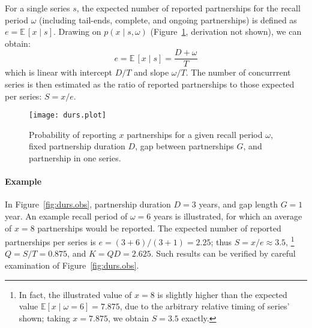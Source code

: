 For a single series $s$, the expected number of reported partnerships for the recall period $\omega$
(including tail-ends, complete, and ongoing partnerships)
is defined as $e = \mathbb{E}\,[x\mid s]$.
Drawing on $p(x \mid s,\omega)$ (Figure~\ref{fig:durs.plot}, derivation not shown), we can obtain:
\begin{equation}\label{eq:e.dur}
  e = \mathbb{E}\,[x\mid s] = \frac{D + \omega}{T}
\end{equation}
which is linear with intercept $D/T$ and slope $\omega/T$.
The number of concurrrent series is then estimated as the ratio of reported partnerships
to those expected per series: $S = x/e$.
\begin{figure}
  \centering
  \texttt{[image: durs.plot]}
  \caption{Probability of reporting $x$ partnerships for a given recall period $\omega$,
    fixed partnership duration $D$, gap between partnerships $G$, and partnership in one series.}
  \label{fig:durs.plot}
\end{figure}
\paragraph{Example}
In Figure~\ref{fig:durs.obs},
partnership duration $D = 3$ years, and gap length $G = 1$ year.
An example recall period of $\omega = 6$ years is illustrated,
for which an average of $x = 8$ partnerships would be reported.
The expected number of reported partnerships per series is $e = (3+6)/(3+1) = 2.25$;
thus $S = x/e \approx 3.5$,%
\footnote{In fact, the illustrated value of $x = 8$ is slightly higher than
  the expected value $\mathbb{E}[x \mid \omega = 6] = 7.875$,
  due to the arbitrary relative timing of series' shown;
  taking $x = 7.875$, we obtain $S = 3.5$ exactly.}
$Q = S/T = 0.875$, and $K = QD = 2.625$.
Such results can be verified by careful examination of Figure~\ref{fig:durs.obs}.
